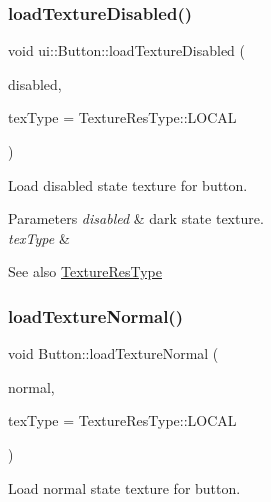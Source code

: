 \subsubsection{\texorpdfstring{load\+Texture\+Disabled()}{loadTextureDisabled()}\hspace{0.1cm}{\footnotesize\ttfamily [2/2]}}
{\footnotesize\ttfamily void ui\+::\+Button\+::load\+Texture\+Disabled (\begin{DoxyParamCaption}\item[{const std\+::string \&}]{disabled,  }\item[{\hyperlink{classui_1_1Widget_a040a65ec5ad3b11119b7e16b98bd9af0}{Texture\+Res\+Type}}]{tex\+Type = {\ttfamily TextureResType\+:\+:LOCAL} }\end{DoxyParamCaption})}

Load disabled state texture for button.


\begin{DoxyParams}{Parameters}
{\em disabled} & dark state texture. \\
\hline
{\em tex\+Type} & \\
\hline
\end{DoxyParams}
\begin{DoxySeeAlso}{See also}
{\ttfamily \hyperlink{classui_1_1Widget_a040a65ec5ad3b11119b7e16b98bd9af0}{Texture\+Res\+Type}} 
\end{DoxySeeAlso}
\mbox{\label{classui_1_1Button_afa5562dbbba4044eed7cf10a18398912}} 
\subsubsection{\texorpdfstring{load\+Texture\+Normal()}{loadTextureNormal()}\hspace{0.1cm}{\footnotesize\ttfamily [1/2]}}
{\footnotesize\ttfamily void Button\+::load\+Texture\+Normal (\begin{DoxyParamCaption}\item[{const std\+::string \&}]{normal,  }\item[{\hyperlink{classui_1_1Widget_a040a65ec5ad3b11119b7e16b98bd9af0}{Texture\+Res\+Type}}]{tex\+Type = {\ttfamily TextureResType\+:\+:LOCAL} }\end{DoxyParamCaption})}

Load normal state texture for button.


